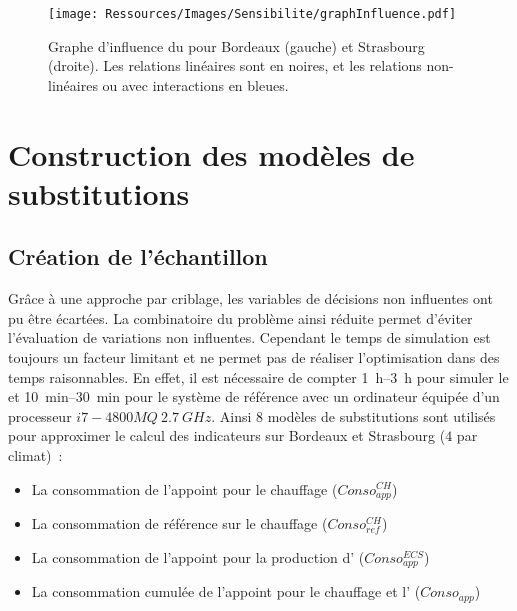 \begin{figure}
    \centering
    \texttt{[image: Ressources/Images/Sensibilite/graphInfluence.pdf]}
    \caption[Graphe d’influence du  pour Bordeaux et Strasbourg]
            {Graphe d’influence du  pour Bordeaux (gauche) et Strasbourg (droite). Les
             relations linéaires sont en noires, et les relations non-linéaires ou
             avec interactions en bleues.}
    \label{fig:graphe_influence_objectifs}
\end{figure}






\section{Construction des modèles de substitutions} %
\label{sec:construction_des_modeles_de_substitutions}
\subsection{Création de l’échantillon} %
\label{sub:creation_de_l_echantillon}
Grâce à une approche par criblage, les variables de décisions non influentes ont pu être
écartées. La combinatoire du problème ainsi réduite permet d’éviter l’évaluation de variations non influentes.
Cependant le temps de simulation est toujours un facteur limitant et ne permet pas
de réaliser l’optimisation dans des temps raisonnables. En effet, il est nécessaire de
compter \SIrange{1}{3}{h} pour simuler le  et \SIrange{10}{30}{min} pour
le système de référence avec un ordinateur équipée d’un processeur $i7-4800MQ\  \SI{2.7}{GHz}$.
Ainsi $8$ modèles de substitutions sont utilisés pour approximer le calcul des indicateurs
sur Bordeaux et Strasbourg ($4$ par climat)~:
\begin{itemize}
  \item La consommation de l’appoint pour le chauffage ($Conso_{app}^{CH}$)
  \item La consommation de référence sur le chauffage ($Conso_{ref}^{CH}$)
  \item La consommation de l’appoint pour la production d’ ($Conso_{app}^{ECS}$)
  \item La consommation cumulée de l’appoint pour le chauffage et l’ ($Conso_{app}$)
\end{itemize}

